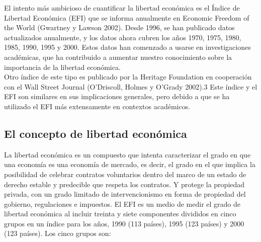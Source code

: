     El intento más ambicioso de cuantificar la libertad económica es el Índice de Libertad Económica (EFI) que se informa anualmente en Economic Freedom of the World (Gwartney y Lawson 2002). Desde 1996, se han publicado datos actualizados anualmente, y los datos ahora cubren los años 1970, 1975, 1980, 1985, 1990, 1995 y 2000. Estos datos han comenzado a usarse en investigaciones académicas, que ha contribuido a aumentar nuestro conocimiento sobre la importancia de la libertad económica.\\
    Otro índice de este tipo es publicado por la Heritage Foundation en cooperación con el Wall Street Journal (O'Driscoll, Holmes y O'Grady 2002).3 Este índice y el EFI son similares en sus implicaciones generales, pero debido a que se ha utilizado el EFI más extensamente en contextos académicos.

    \subsection*{El concepto de libertad económica}
    La libertad económica es un compuesto que intenta caracterizar el grado en que una economía es una economía de mercado, es decir, el grado en el que implica la posibilidad de celebrar contratos voluntarios dentro del marco de un estado de derecho estable y predecible que respeta los contratos. Y protege la propiedad privada, con un grado limitado de intervencionismo en forma de propiedad del gobierno, regulaciones e impuestos. 
    El EFI es un medio de medir el grado de libertad económica al incluir treinta y siete componentes divididos en cinco grupos en un índice para los años, 1990 (113 países), 1995 (123 países) y 2000 (123 países). Los cinco grupos son: 

